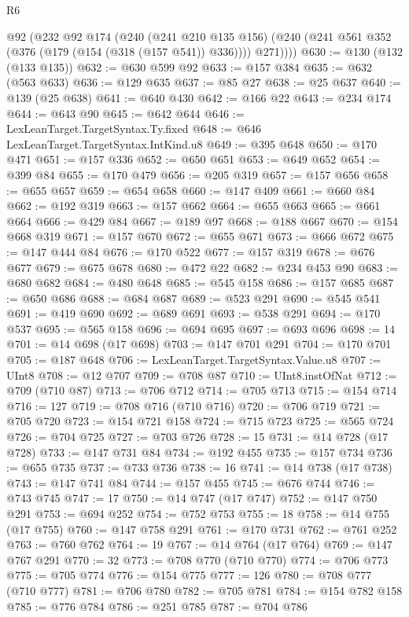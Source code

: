 \begin{lexlean}{R6}
\begin{coremodule}
{{{{{{{{{{{{{{{{{{{{{{{{{{{{{{{{{{{{{{{{{{{{{{{{{{{{{{{{{{{{{{{{{{{{{{{{      @92
      (@232
        @92
        @174
        (@240
          (@241 @210 @135 @156)
          (@240 (@241 @561 @352 (@376 (@179 (@154 (@318 (@157 @541)) @336)))) @271))))
@630 := @130 (@132 (@133 @135))
@632 := @630 @599 @92
@633 := @157 @384
@635 := @632 (@563 @633)
@636 := @129 @635
@637 := @85 @27
@638 := @25 @637
@640 := @139 (@25 @638)
@641 := @640 @430
@642 := @166 @22
@643 := @234 @174
@644 := @643 @90
@645 := @642 @644
@646 := LexLeanTarget.TargetSyntax.Ty.fixed
@648 := @646 LexLeanTarget.TargetSyntax.IntKind.u8
@649 := @395 @648
@650 := @170 @471
@651 := @157 @336
@652 := @650 @651
@653 := @649 @652
@654 := @399 @84
@655 := @170 @479
@656 := @205 @319
@657 := @157 @656
@658 := @655 @657
@659 := @654 @658
@660 := @147 @409
@661 := @660 @84
@662 := @192 @319
@663 := @157 @662
@664 := @655 @663
@665 := @661 @664
@666 := @429 @84
@667 := @189 @97
@668 := @188 @667
@670 := @154 @668 @319
@671 := @157 @670
@672 := @655 @671
@673 := @666 @672
@675 := @147 @444 @84
@676 := @170 @522
@677 := @157 @319
@678 := @676 @677
@679 := @675 @678
@680 := @472 @22
@682 := @234 @453 @90
@683 := @680 @682
@684 := @480 @648
@685 := @545 @158
@686 := @157 @685
@687 := @650 @686
@688 := @684 @687
@689 := @523 @291
@690 := @545 @541
@691 := @419 @690
@692 := @689 @691
@693 := @538 @291
@694 := @170 @537
@695 := @565 @158
@696 := @694 @695
@697 := @693 @696
@698 := 14
@701 := @14 @698 (@17 @698)
@703 := @147 @701 @291
@704 := @170 @701
@705 := @187 @648
@706 := LexLeanTarget.TargetSyntax.Value.u8
@707 := UInt8
@708 := @12 @707
@709 := @708 @87
@710 := UInt8.instOfNat
@712 := @709 (@710 @87)
@713 := @706 @712
@714 := @705 @713
@715 := @154 @714
@716 := 127
@719 := @708 @716 (@710 @716)
@720 := @706 @719
@721 := @705 @720
@723 := @154 @721 @158
@724 := @715 @723
@725 := @565 @724
@726 := @704 @725
@727 := @703 @726
@728 := 15
@731 := @14 @728 (@17 @728)
@733 := @147 @731 @84
@734 := @192 @455
@735 := @157 @734
@736 := @655 @735
@737 := @733 @736
@738 := 16
@741 := @14 @738 (@17 @738)
@743 := @147 @741 @84
@744 := @157 @455
@745 := @676 @744
@746 := @743 @745
@747 := 17
@750 := @14 @747 (@17 @747)
@752 := @147 @750 @291
@753 := @694 @252
@754 := @752 @753
@755 := 18
@758 := @14 @755 (@17 @755)
@760 := @147 @758 @291
@761 := @170 @731
@762 := @761 @252
@763 := @760 @762
@764 := 19
@767 := @14 @764 (@17 @764)
@769 := @147 @767 @291
@770 := 32
@773 := @708 @770 (@710 @770)
@774 := @706 @773
@775 := @705 @774
@776 := @154 @775
@777 := 126
@780 := @708 @777 (@710 @777)
@781 := @706 @780
@782 := @705 @781
@784 := @154 @782 @158
@785 := @776 @784
@786 := @251 @785
@787 := @704 @786
}}}}}}}}}}}}}}}}}}}}}}}}}}}}}}}}}}}}}}}}}}}}}}}}}}}}}}}}}}}}}}}}}}}}}}}}
\end{coremodule}
\end{lexlean}
